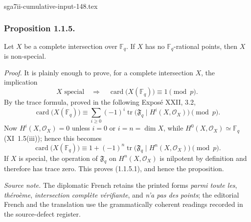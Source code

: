 \begin{filecontents*}{sga7ii-cumulative-input-148.tex}
\subsubsection*{Proposition 1.1.5.}
Let $X$ be a complete intersection over $\mathbb F_q$.  If $X$ has no
$\mathbb F_q$-rational points, then $X$ is non-special.

\medskip
\noindent\emph{Proof.}
It is plainly enough to prove, for a complete intersection $X$, the
implication
\begin{equation}\tag{1.1.5.1}
X\text{ special}\quad\Longrightarrow\quad
\operatorname{card}\bigl(X(\mathbb F_q)\bigr)\equiv1\pmod p.
\end{equation}
By the trace formula, proved in the following Exposé XXII, 3.2,
\begin{equation*}
\operatorname{card}\bigl(X(\mathbb F_q)\bigr)
\equiv\sum_{i\geq0}(-1)^i
\operatorname{tr}\bigl(\mathfrak F_q\mid H^i(X,\mathcal O_X)\bigr)
\pmod p.
\end{equation*}
Now $H^i(X,\mathcal O_X)=0$ unless $i=0$ or $i=n=\dim X$, while
$H^0(X,\mathcal O_X)\simeq\mathbb F_q$ (XI~1.5(iii)); hence this becomes
\begin{equation*}
\operatorname{card}\bigl(X(\mathbb F_q)\bigr)
\equiv1+(-1)^n
\operatorname{tr}\bigl(\mathfrak F_q\mid H^n(X,\mathcal O_X)\bigr)
\pmod p.
\end{equation*}
If $X$ is special, the operation of $\mathfrak F_q$ on
$H^n(X,\mathcal O_X)$ is nilpotent by definition and therefore has trace
zero.  This proves (1.1.5.1), and hence the proposition.

\medskip
\noindent\emph{Source note.}
The diplomatic French retains the printed forms \emph{parmi toute les},
\emph{théroème}, \emph{intersection complète vérifiante}, and
\emph{n'a pas des points}; the editorial French and the translation use the
grammatically coherent readings recorded in the source-defect register.
\end{filecontents*}
